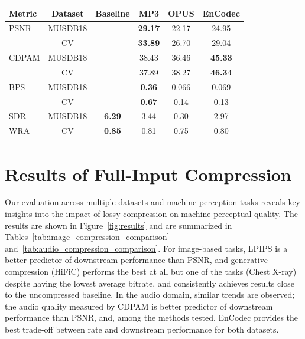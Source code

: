\documentclass[10pt,twocolumn,letterpaper]{article}
\begin{document}
\begin{table}[!htb]
\begin{subtable}{.4\linewidth}
         \setlength{\tabcolsep}{3pt}
        {\small\begin{tabular}{lccccc}
        \toprule
        Metric & Dataset & Baseline & MP3 & OPUS & EnCodec \\
        \midrule
        PSNR & MUSDB18 &  &\textbf{ 29.17} & 22.17 & 24.95 \\
             & CV &  & \textbf{33.89} & 26.70 & 29.04 \\
        \midrule
        CDPAM & MUSDB18 &  & 38.43 & 36.46 & \textbf{45.33} \\
              & CV &  & 37.89 & 38.27 & \textbf{46.34} \\
        \midrule
        BPS & MUSDB18 &  & \textbf{0.36} & 0.066 & 0.069 \\
            & CV &  & \textbf{0.67} & 0.14 & 0.13 \\
        \midrule
        SDR & MUSDB18 & \textbf{6.29} & 3.44 & 0.30 & 2.97 \\
        \midrule
        WRA & CV & \textbf{0.85} & 0.81 & 0.75 & 0.80 \\
        \bottomrule
        \end{tabular}}
    \end{subtable}%
\end{table}

\section{Results of Full-Input Compression}

Our evaluation across multiple datasets and machine perception tasks reveals key insights into the impact of lossy compression on machine perceptual quality. The results are shown in Figure~\ref{fig:results} and are summarized in Tables~\ref{tab:image_compression_comparison} and~\ref{tab:audio_compression_comparison}. For image-based tasks, LPIPS is a better predictor of downstream performance than PSNR, and generative compression (HiFiC) performs the best at all but one of the tasks (Chest X-ray) despite having the lowest average bitrate, and consistently achieves results close to the uncompressed baseline. In the audio domain, similar trends are observed; the audio quality measured by CDPAM is better predictor of downstream performance than PSNR, and, among the methods tested, EnCodec provides the best trade-off between rate and downstream performance for both datasets.
\end{document}
